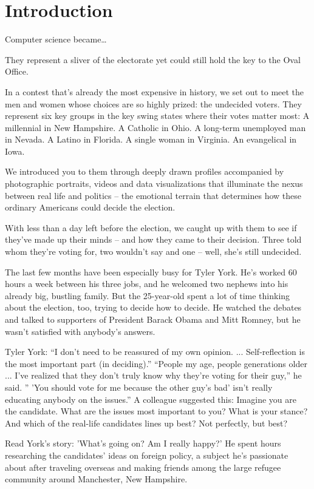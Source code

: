 \documentclass[%
        TwoSidePages,%
        Portuguese,%
        FinalVersion,%
        TablesPage,%
        FiguresPage,%
        ]%
{ic-tese-v2}
\begin{document}
\chapter{Introduction}
Computer science became\ldots

They represent a sliver of the electorate yet could still hold the key to the Oval Office.

In a contest that's already the most expensive in history, we set out to meet the men and women whose choices are so highly prized: the undecided voters.
They represent six key groups in the key swing states where their votes matter most:
A millennial in New Hampshire. A Catholic in Ohio. A long-term unemployed man in Nevada. A Latino in Florida. A single woman in Virginia. An evangelical in Iowa.

We introduced you to them through deeply drawn profiles accompanied by photographic portraits, videos and data visualizations that illuminate the nexus between real life and politics -- the emotional terrain that determines how these ordinary Americans could decide the election.

With less than a day left before the election, we caught up with them to see if they've made up their minds -- and how they came to their decision. Three told whom they're voting for, two wouldn't say and one -- well, she's still undecided.

The last few months have been especially busy for Tyler York. He's worked 60 hours a week between his three jobs, and he welcomed two nephews into his already big, bustling family.
But the 25-year-old spent a lot of time thinking about the election, too, trying to decide how to decide. He watched the debates and talked to supporters of President Barack Obama and Mitt Romney, but he wasn't satisfied with anybody's answers.

Tyler York: ``I don't need to be reassured of my own opinion. ... Self-reflection is the most important part (in deciding).''
``People my age, people generations older ... I've realized that they don't truly know why they're voting for their guy,'' he said. '' 'You should vote for me because the other guy's bad' isn't really educating anybody on the issues.''
A colleague suggested this: Imagine you are the candidate. What are the issues most important to you? What is your stance? And which of the real-life candidates lines up best? Not perfectly, but best?

Read York's story: 'What's going on? Am I really happy?'
He spent hours researching the candidates' ideas on foreign policy, a subject he's passionate about after traveling overseas and making friends among the large refugee community around Manchester, New Hampshire.
\end{document}
